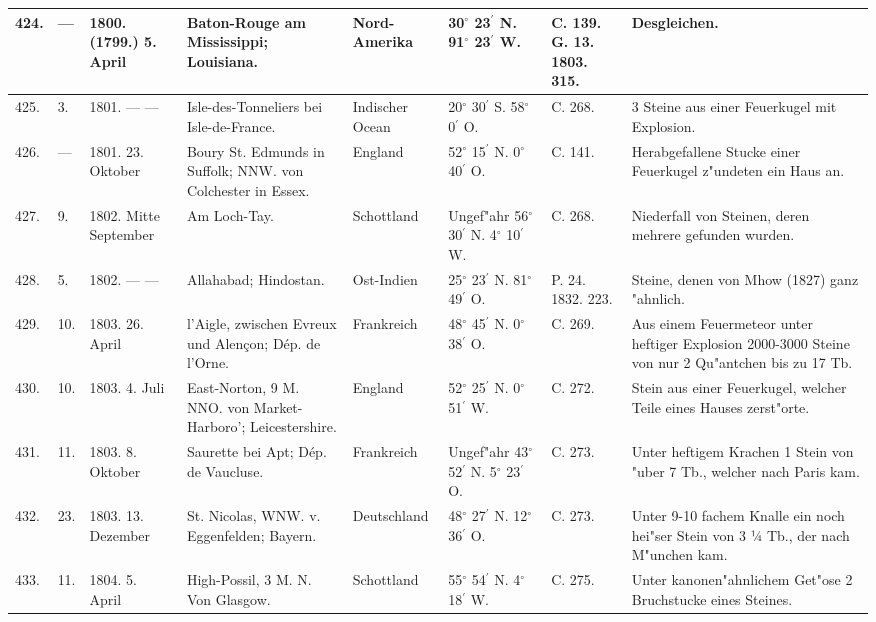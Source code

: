 \documentclass[a4paper, 8pt, oneside, polutonikogreek, german]{article}
\begin{document}
\begin{center}
\begin{longtable}{| p{5mm} | p{3mm} | p{15mm} | p{25mm} | p{20mm} | p{14mm} | p{17mm} | p{24mm} |}
        424. & --- & 1800. (1799.) 5. April & Baton-Rouge am Mississippi; Louisiana. & Nord-Amerika & 30$^\circ$ 23$^\prime$ N. 91$^\circ$ 23$^\prime$ W. & C. 139. G. 13. 1803. 315. & Desgleichen. \\ \hline
        425. & 3. & 1801. --- --- & Isle-des-Tonneliers bei Isle-de-France. & Indischer Ocean & 20$^\circ$ 30$^\prime$ S. 58$^\circ$ 0$^\prime$ O. & C. 268. & 3 Steine aus einer Feuerkugel mit Explosion. \\ \hline
        426. & --- & 1801. 23. Oktober & Boury St. Edmunds in Suffolk; NNW. von Colchester in Essex. & England & 52$^\circ$ 15$^\prime$ N. 0$^\circ$ 40$^\prime$ O. & C. 141. & Herabgefallene Stucke einer Feuerkugel z"undeten ein Haus an. \\ \hline
        427. & 9. & 1802. Mitte September & Am Loch-Tay. & Schottland & Ungef"ahr 56$^\circ$ 30$^\prime$ N. 4$^\circ$ 10$^\prime$ W. & C. 268. & Niederfall von Steinen, deren mehrere gefunden wurden. \\ \hline
        428. & 5. & 1802. --- --- & Allahabad; Hindostan. & Ost-Indien & 25$^\circ$ 23$^\prime$ N. 81$^\circ$ 49$^\prime$ O. & P. 24. 1832. 223. & Steine, denen von Mhow (1827) ganz "ahnlich. \\ \hline
        429. & 10. & 1803. 26. April & l’Aigle, zwischen Evreux und Alençon; Dép. de l’Orne. & Frankreich & 48$^\circ$ 45$^\prime$ N. 0$^\circ$ 38$^\prime$ O. & C. 269. & Aus einem Feuermeteor unter heftiger Explosion 2000-3000 Steine von nur 2 Qu"antchen bis zu 17 Tb. \\ \hline
        430. & 10. & 1803. 4. Juli & East-Norton, 9 M. NNO. von Market-Harboro’; Leicestershire. & England & 52$^\circ$ 25$^\prime$ N. 0$^\circ$ 51$^\prime$ W. & C. 272. & Stein aus einer Feuerkugel, welcher Teile eines Hauses zerst"orte. \\ \hline
        431. & 11. & 1803. 8. Oktober & Saurette bei Apt; Dép. de Vaucluse. & Frankreich & Ungef"ahr 43$^\circ$ 52$^\prime$ N. 5$^\circ$ 23$^\prime$ O. & C. 273. & Unter heftigem Krachen 1 Stein von "uber 7 Tb., welcher nach Paris kam. \\ \hline
        432. & 23. & 1803. 13. Dezember & St. Nicolas, WNW. v. Eggenfelden; Bayern. & Deutschland & 48$^\circ$ 27$^\prime$ N. 12$^\circ$ 36$^\prime$ O. & C. 273. & Unter 9-10 fachem Knalle ein noch hei"ser Stein von 3 ¼ Tb., der nach M"unchen kam. \\ \hline
        433. & 11. & 1804. 5. April & High-Possil, 3 M. N. Von Glasgow. & Schottland & 55$^\circ$ 54$^\prime$ N. 4$^\circ$ 18$^\prime$ W. & C. 275. & Unter kanonen"ahnlichem Get"ose 2 Bruchstucke eines Steines. \\ \hline

\end{longtable}
\end{center}
\end{document}

